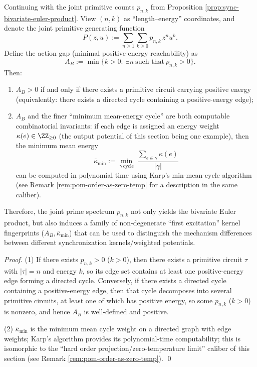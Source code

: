 \begin{proposition}\label{prop:sync-action-gap}
Continuing with the joint primitive counts \(p_{n,k}\) from Proposition \ref{prop:sync-bivariate-euler-product}.
View \((n,k)\) as ``length--energy'' coordinates, and denote the joint primitive generating function
\[
P(z,u):=\sum_{n\ge 1}\sum_{k\ge 0}p_{n,k}\,z^n u^k.
\]
Define the action gap (minimal positive energy reachability) as
\[
A_B:=\min\{k>0:\ \exists n\ \text{such that}\ p_{n,k}>0\}.
\]
Then:
\begin{enumerate}
  \item \(A_B>0\) if and only if there exists a primitive circuit carrying positive energy (equivalently: there exists a directed cycle containing a positive-energy edge);
  \item \(A_B\) and the finer ``minimum mean-energy cycle'' are both computable combinatorial invariants: if each edge is assigned an energy weight \(\kappa(e)\in\ZZ_{\ge 0}\) (the output potential of this section being one example), then the minimum mean energy
  \[
  \bar\kappa_{\min}:=\min_{\gamma\ \mathrm{cycle}}\ \frac{\sum_{e\in\gamma}\kappa(e)}{|\gamma|}
  \]
  can be computed in polynomial time using Karp's min-mean-cycle algorithm (see Remark \ref{rem:pom-order-as-zero-temp} for a description in the same caliber).
\end{enumerate}
Therefore, the joint prime spectrum \(p_{n,k}\) not only yields the bivariate Euler product, but also induces a family of non-degenerate ``first excitation'' kernel fingerprints (\(A_B,\bar\kappa_{\min}\)) that can be used to distinguish the mechanism differences between different synchronization kernels/weighted potentials.
\end{proposition}
\begin{proof}
(1) If there exists \(p_{n,k}>0\) (\(k>0\)), then there exists a primitive circuit \(\tau\) with \(|\tau|=n\) and energy \(k\), so its edge set contains at least one positive-energy edge forming a directed cycle. Conversely, if there exists a directed cycle containing a positive-energy edge, then that cycle decomposes into several primitive circuits, at least one of which has positive energy, so some \(p_{n,k}\) (\(k>0\)) is nonzero, and hence \(A_B\) is well-defined and positive.

(2) \(\bar\kappa_{\min}\) is the minimum mean cycle weight on a directed graph with edge weights; Karp's algorithm provides its polynomial-time computability; this is isomorphic to the ``hard order projection/zero-temperature limit'' caliber of this section (see Remark \ref{rem:pom-order-as-zero-temp}). \qed
\end{proof}

